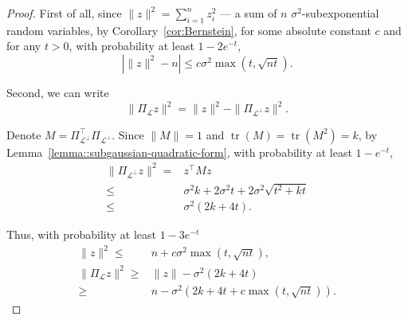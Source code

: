 \documentclass[11pt,notitlepage]{article}
\newcommand\Ls {\mathscr{L}}
\newcommand\tr {\ensuremath{\operatorname{\mathrm{tr}}}}
\begin{document}
\begin{proof}
	First of all, since $\|z\|^2 = \sum_{i=1}^n z_i^2$ --- a sum of
    $n$ $\sigma^2$-subexponential random variables, by
    Corollary~\ref{cor:Bernstein}, for some absolute constant $c$
    and for any $t > 0$, with probability at least $1 - 2e^{-t}$,
	\[
		\left|\|z\|^2 - n\right| \leq c\sigma^2\max(t, \sqrt{nt}).
	\]
	
	Second, we can write
	\[
		\|\Pi_{\Ls} z\|^2 = \|z\|^2 - \|\Pi_{\Ls^\perp} z\|^2.
	\]
	
	Denote $M = \Pi_{\Ls^\perp}^\top \Pi_{\Ls^\perp}$. 	Since $\|M\| =
    1$ and $\tr\left(M\right) = \tr(M^2) = k$, by
    Lemma~\ref{lemma::subgaussian-quadratic-form},
    with probability at least $1 - e^{-t}$,
	\begin{align*}
	 \|\Pi_{\Ls^\perp} z\|^2 =& z^\top M z\\
	 \leq& \sigma^2 k + 2\sigma^2 t + 2\sigma^2\sqrt{t^2 + kt}\\
	 \leq& \sigma^2(2k+4t).
	\end{align*}
	
	Thus, with probability at least $1-3e^{-t}$
	\begin{align*}
	\|z\|^2 \leq& n + c\sigma^2\max(t, \sqrt{nt}),\\
	\|\Pi_{\Ls} z\|^2 \geq& \|z\| -  \sigma^2(2k+4t)\\
	\geq& n -  \sigma^2(2k + 4t + c\max(t, \sqrt{nt})).
	\end{align*}
\end{proof}
\end{document}

